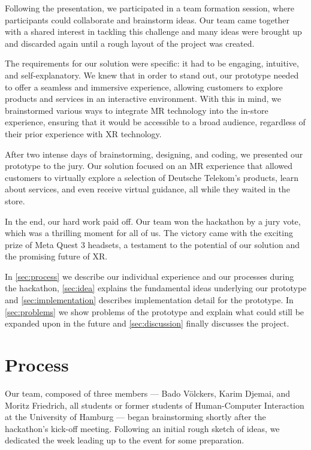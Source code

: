 \documentclass[12pt]{article}
\begin{document}
Following the presentation, we participated in a team formation session, where participants could collaborate and brainstorm ideas. Our team came together with a shared interest in tackling this challenge and many ideas were brought up and discarded again until a rough layout of the project was created.

The requirements for our solution were specific: it had to be engaging, intuitive, and self-explanatory. We knew that in order to stand out, our prototype needed to offer a seamless and immersive experience, allowing customers to explore products and services in an interactive environment. With this in mind, we brainstormed various ways to integrate MR technology into the in-store experience, ensuring that it would be accessible to a broad audience, regardless of their prior experience with XR technology.

After two intense days of brainstorming, designing, and coding, we presented our prototype to the jury. Our solution focused on an MR experience that allowed customers to virtually explore a selection of Deutsche Telekom’s products, learn about services, and even receive virtual guidance, all while they waited in the store. 

In the end, our hard work paid off. Our team won the hackathon by a jury vote, which was a thrilling moment for all of us. The victory came with the exciting prize of Meta Quest 3 headsets, a testament to the potential of our solution and the promising future of XR.

In \autoref{sec:process} we describe our individual experience and our processes during the hackathon, \autoref{sec:idea} explains the fundamental ideas underlying our prototype and \autoref{sec:implementation} describes implementation detail for the prototype. In \autoref{sec:problems} we show problems of the prototype and explain what could still be expanded upon in the future and \autoref{sec:discussion} finally discusses the project.


\section{Process}
\label{sec:process}
Our team, composed of three members — Bado Völckers, Karim Djemai, and Moritz Friedrich, all students or former students of Human-Computer Interaction at the University of Hamburg — began brainstorming shortly after the hackathon’s kick-off meeting. Following an initial rough sketch of ideas, we dedicated the week leading up to the event for some preparation.
\end{document}
